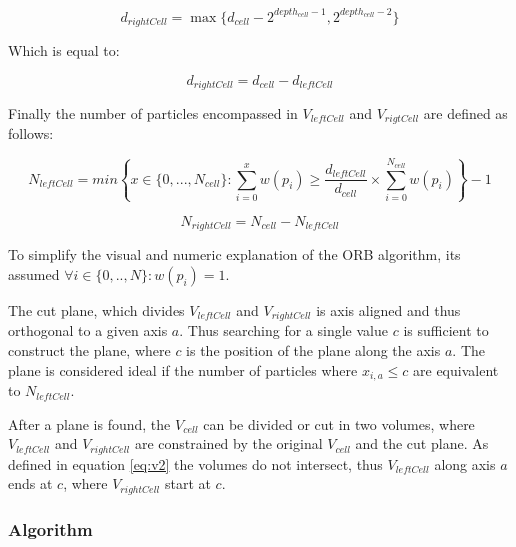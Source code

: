 \documentclass[]{article}
\begin{document}
\begin{center}
	\begin{equation}  \label{eq:d2}
		d_{rightCell} = \max \{ d_{cell} - 2^{depth_{cell} -1}, 2^{depth_{cell} - 2}\}
	\end{equation}
\end{center}

Which is equal to:

\begin{center}
	\begin{equation}  \label{eq:d22}
		d_{rightCell} = d_{cell} - d_{leftCell}
	\end{equation}
\end{center}


Finally the number of particles encompassed in $V_{leftCell}$ and $V_{rigtCell}$ are defined as follows:

\begin{center}
	\begin{equation}\label{eq:N1}
		N_{leftCell} = min \left \{ x \in \{0,...,N_{cell} \} : \sum_{i=0}^{x} w(p_i) \geq \frac{d_{leftCell}}{d_{cell}} \times \sum_{i=0}^{N_{cell}} w(p_i) \right \} - 1
	\end{equation}
\end{center}

\begin{center}
	\begin{equation}\label{eq:N2}
		N_{rightCell} = N_{cell} - N_{leftCell}
	\end{equation}
\end{center}

To simplify the visual and numeric explanation of the ORB algorithm, its assumed  $\forall i \in \{0,..,N\} : w(p_i) = 1$.

The cut plane, which divides $V_{leftCell}$ and $V_{rightCell}$ is axis aligned and thus orthogonal to a given axis $a$. Thus searching for a single value $c$ is sufficient to construct the plane, where $c$ is the position of the plane along the axis $a$. The plane is considered ideal if the number of particles where $x_{i,a} \leq c$ are equivalent to $N_{leftCell}$. 

After a plane is found, the $V_{cell}$ can be divided or cut in two volumes, where $V_{leftCell}$ and $V_{rightCell}$ are constrained by the original $V_{cell}$ and the cut plane. As defined in equation \ref{eq:v2} the volumes do not intersect, thus $V_{leftCell}$ along axis $a$ ends at $c$, where $V_{rightCell}$ start at $c$.
    
  
\subsubsection{Algorithm}
\end{document}
